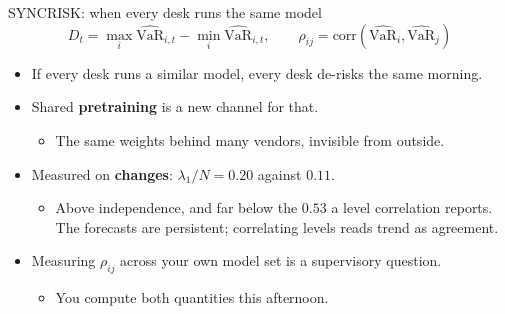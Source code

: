 \documentclass[9pt, aspectratio=169, t]{beamer}
\begin{document}
\begin{frame}{SYNCRISK: when every desk runs the same model}
  \[ D_{t} = \max_{i}\widehat{\mathrm{VaR}}_{i,t} - \min_{i}\widehat{\mathrm{VaR}}_{i,t},
     \qquad
     \rho_{ij} = \mathrm{corr}\!\left(\widehat{\mathrm{VaR}}_{i},
     \widehat{\mathrm{VaR}}_{j}\right) \]
  \begin{itemize}
    \item If every desk runs a similar model, every desk de-risks the same morning.
    \item Shared \textbf{pretraining} is a new channel for that.
      \begin{itemize}
        \item The same weights behind many vendors, invisible from outside.
      \end{itemize}
    \item Measured on \textbf{changes}: $\lambda_1/N = 0.20$ against $0.11$.
      \begin{itemize}
        \item Above independence, and far below the $0.53$ a level correlation reports.
              The forecasts are persistent; correlating levels reads trend as agreement.
      \end{itemize}
    \item Measuring $\rho_{ij}$ across your own model set is a supervisory question.
      \begin{itemize}
        \item You compute both quantities this afternoon.
      \end{itemize}
  \end{itemize}
\end{frame}
\end{document}
